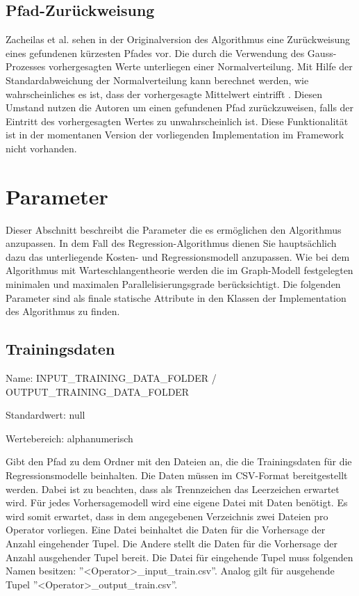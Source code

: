\subsection{Pfad-Zurückweisung}

Zacheilas et al. sehen in der Originalversion des Algorithmus eine Zurückweisung eines gefundenen kürzesten Pfades vor.
Die durch die Verwendung des Gauss-Prozesses vorhergesagten Werte unterliegen einer Normalverteilung.
Mit Hilfe der Standardabweichung der Normalverteilung kann berechnet werden, wie wahrscheinliches es ist, dass der vorhergesagte Mittelwert eintrifft \cite{zacheilas_elastic_2015}.
Diesen Umstand nutzen die Autoren um einen gefundenen Pfad zurückzuweisen, falls der Eintritt des vorhergesagten Wertes zu unwahrscheinlich ist.
Diese Funktionalität ist in der momentanen Version der vorliegenden Implementation im Framework nicht vorhanden.

\section{Parameter}

Dieser Abschnitt beschreibt die Parameter die es ermöglichen den Algorithmus anzupassen.
In dem Fall des Regression-Algorithmus dienen Sie hauptsächlich dazu das unterliegende Kosten- und Regressionsmodell anzupassen.
Wie bei dem Algorithmus mit Warteschlangentheorie werden die im Graph-Modell festgelegten minimalen und maximalen Parallelisierungsgrade berücksichtigt.
Die folgenden Parameter sind als finale statische Attribute in den Klassen der Implementation des Algorithmus zu finden.

\subsection{Trainingsdaten}

Name: INPUT\_TRAINING\_DATA\_FOLDER / OUTPUT\_TRAINING\_DATA\_FOLDER

Standardwert: null

Wertebereich: alphanumerisch

Gibt den Pfad zu dem Ordner mit den Dateien an, die die Trainingsdaten für die Regressionsmodelle beinhalten.
Die Daten müssen im CSV-Format bereitgestellt werden.
Dabei ist zu beachten, dass als Trennzeichen das Leerzeichen erwartet wird.
Für jedes Vorhersagemodell wird eine eigene Datei mit Daten benötigt.
Es wird somit erwartet, dass in dem angegebenen Verzeichnis zwei Dateien pro Operator vorliegen.
Eine Datei beinhaltet die Daten für die Vorhersage der Anzahl eingehender Tupel.
Die Andere stellt die Daten für die Vorhersage der Anzahl ausgehender Tupel bereit.
Die Datei für eingehende Tupel muss folgenden Namen besitzen: ''<Operator>\_input\_train.csv''.
Analog gilt für ausgehende Tupel ''<Operator>\_output\_train.csv''.

